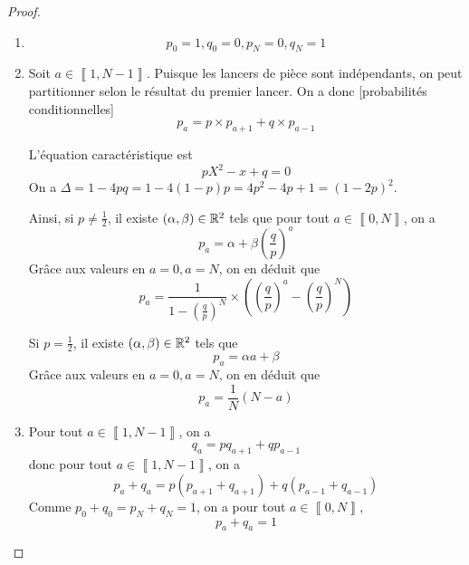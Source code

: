 \documentclass[12pt]{article}
\begin{document}
\begin{proof}
    \phantom{}
    \begin{enumerate}
        \item 
        \begin{equation}
            \boxed{p_{0}=1,q_{0}=0,p_{N}=0,q_{N}=1}
        \end{equation}
        \item Soit $a\in\left\llbracket 1,N-1\right\rrbracket$. Puisque les lancers de pièce sont indépendants, on peut partitionner selon le résultat du premier lancer. On a donc [probabilités conditionnelles]
        \begin{equation}
            \boxed{p_{a}=p\times p_{a+1}+q\times p_{a-1}}
        \end{equation}

        L'équation caractéristique est 
        \begin{equation}
            pX^{2}-x+q=0
        \end{equation}
        On a $\Delta=1-4pq=1-4\left(1-p\right)p=4p^{2}-4p+1=\left(1-2p\right)^{2}$.

        Ainsi, si $p\neq\frac{1}{2}$, il existe $\left(\alpha,\beta\right)\in\mathbb{R}^{2}$ tels que pour tout $a\in\left\llbracket 0,N\right\rrbracket$, on a 
        \begin{equation}
            p_{a}=\alpha+\beta\left(\frac{q}{p}\right)^{a}
        \end{equation}
        Grâce aux valeurs en $a=0,a=N$, on en déduit que 
        \begin{equation}
            \boxed{p_{a}=\frac{1}{1-\left(\frac{q}{p}\right)^{N}}\times\left(\left(\frac{q}{p}\right)^{a}-\left(\frac{q}{p}\right)^{N}\right)}
        \end{equation}

        Si $p=\frac{1}{2}$, il existe $\left(\alpha,\beta\right)\in\mathbb{R}^{2}$ tels que 
        \begin{equation}
            p_{a}=\alpha a+\beta
        \end{equation}
        Grâce aux valeurs en $a=0,a=N$, on en déduit que 
        \begin{equation}
            \boxed{p_{a}=\frac{1}{N}\left(N-a\right)}
        \end{equation}

        \item Pour tout $a\in\left\llbracket 1,N-1\right\rrbracket$, on a 
        \begin{equation}
            q_{a}=pq_{a+1}+qp_{a-1}
        \end{equation}
        donc pour tout $a\in\left\llbracket 1,N-1\right\rrbracket$, on a 
        \begin{equation}
            p_{a}+q_{a}=p\left(p_{a+1}+q_{a+1}\right)+q\left(p_{a-1}+q_{a-1}\right)
        \end{equation}
        Comme $p_{0}+q_{0}=p_{N}+q_{N}=1$, on a pour tout $a\in\left\llbracket 0,N\right\rrbracket$,
        \begin{equation}
            \boxed{p_{a}+q_{a}=1}
        \end{equation}


\end{enumerate}
\end{proof}
\end{document}
